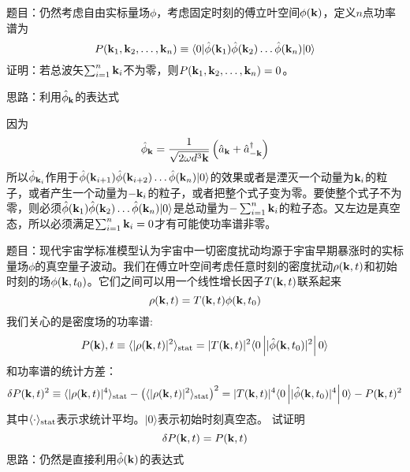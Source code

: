 \documentclass[CJK]{beamer}
\begin{document}
\begin{frame}
\bch
{\small 
题目：仍然考虑自由实标量场$\phi$，考虑固定时刻的傅立叶空间$\phi({\mathbf{k}})$，定义$n$点功率谱为
$$P({\mathbf{k}}_1,{\mathbf{k}}_2,\ldots,{\mathbf{k}}_n) \equiv \langle 0 | {\hat{\phi}}({\mathbf{k}}_1){\hat{\phi}}({\mathbf{k}}_2)\ldots{\hat{\phi}}({\mathbf{k}}_n)|0\rangle$$
证明：若总波矢$\sum_{i=1}^n{\mathbf{k}}_i$不为零，则$P({\mathbf{k}}_1,{\mathbf{k}}_2,\ldots,{\mathbf{k}}_n) = 0$。

\skipline
思路：利用${\hat{\phi}}_{{\mathbf{k}}}$的表达式

}

\ech
\end{frame}

\begin{frame}
\bch
{\small 
因为
$${\hat{\phi}}_{\mathbf{k}} = \frac{1}{\sqrt{2\omega d^3{\mathbf{k}}}}\left({\hat{a}}_{\mathbf{k}} + {\hat{a}^\dagger}_{-{\mathbf{k}}}\right)$$
所以${\hat{\phi}}_{{\mathbf{k}}_i}$作用于${\hat{\phi}}({\mathbf{k}}_{i+1}){\hat{\phi}}({\mathbf{k}}_{i+2})\ldots{\hat{\phi}}({\mathbf{k}}_n)|0\rangle$的效果或者是湮灭一个动量为${\mathbf{k}}_i$的粒子，或者产生一个动量为$-{\mathbf{k}}_i$的粒子，或者把整个式子变为零。要使整个式子不为零，则必须${\hat{\phi}}({\mathbf{k}}_1){\hat{\phi}}({\mathbf{k}}_2)\ldots{\hat{\phi}}({\mathbf{k}}_n)|0\rangle$是总动量为$-\sum_{i=1}^{n}{\mathbf{k}}_i$的粒子态。又左边是真空态，所以必须满足$\sum_{i=1}^{n}{\mathbf{k}}_i=0$才有可能使功率谱非零。

}

\ech
\end{frame}


\begin{frame}
\bch
{\scriptsize
题目：现代宇宙学标准模型认为宇宙中一切密度扰动均源于宇宙早期暴涨时的实标量场$\phi$的真空量子波动。我们在傅立叶空间考虑任意时刻的密度扰动$\rho({\mathbf{k}}, t)$和初始时刻的场$\phi({\mathbf{k}}, t_0)$。它们之间可以用一个线性增长因子$T({\mathbf{k}},t)$联系起来
$$\rho ({\mathbf{k}}, t) = T({\mathbf{k}}, t) \phi({\mathbf{k}}, t_0)$$
我们关心的是密度场的功率谱:
$$P({\mathbf{k}}),t\equiv \langle |\rho ({\mathbf{k}}, t)|^2\rangle_{\rm stat} = |T({\mathbf{k}}, t)|^2\langle 0\left\vert |{\hat{\phi}}({\mathbf{k}}, t_0)|^2 \right\vert 0 \rangle$$
和功率谱的统计方差：{\scriptsize
$$ \delta P({\mathbf{k}},t)^2 \equiv \langle |\rho ({\mathbf{k}}, t)|^4 \rangle_{\rm stat} - \left(\langle |\rho ({\mathbf{k}}, t)|^2 \rangle_{\rm stat} \right)^ 2 = |T({\mathbf{k}}, t)|^4\langle 0\left\vert |{\hat{\phi}}({\mathbf{k}}, t_0)|^4 \right\vert 0 \rangle - P({\mathbf{k}},t)^2 $$ }
其中$\langle \cdot \rangle_{\rm stat}$表示求统计平均。$|0\rangle$表示初始时刻真空态。
试证明$$\delta P({\mathbf{k}},t) = P({\mathbf{k}},t)$$
}
{\small 
思路：仍然是直接利用${\hat{\phi}}({\mathbf{k}})$的表达式}
\ech
\end{frame}
\end{document}
